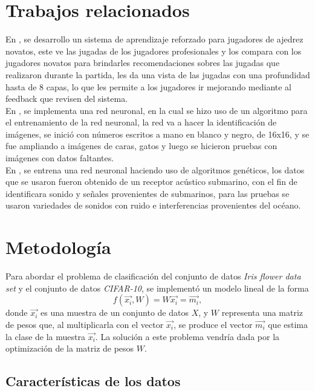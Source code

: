 \documentclass[conference]{IEEEtran}
\begin{document}
\section{Trabajos relacionados}
	En \cite{AppGen}, se desarrollo un sistema de aprendizaje reforzado para jugadores de ajedrez novatos, este ve las jugadas de los jugadores profesionales y los compara con los jugadores novatos para brindarles recomendaciones sobres las jugadas que realizaron durante la partida, les da una vista de las jugadas con una profundidad hasta de 8 capas, lo que les permite a los jugadores ir mejorando mediante al feedback que revisen del sistema. \\
    
    En \cite{Lamos-Sweeney}, se implementa una red neuronal, en la cual se hizo uso de un algoritmo para el entrenamiento de la red neuronal, la red va a hacer la identificación de imágenes, se inició con números escritos a mano en blanco y negro, de 16x16, y se fue ampliando a imágenes de caras, gatos y luego se hicieron pruebas con imágenes con datos faltantes. \\ 
    
    En \cite{Montana}, se entrena una red neuronal haciendo uso de algoritmos genéticos, los datos que se usaron fueron obtenido de un receptor acústico submarino, con el fin de identificara sonido y señales provenientes de submarinos, para las pruebas se usaron variedades de sonidos con ruido e interferencias provenientes del océano. 

\section{Metodología}
	
    Para abordar el problema de clasificación del conjunto de datos \textit{Iris flower data set} y el conjunto de datos \textit{CIFAR-10}, se implementó un modelo lineal de la forma 
 \begin{equation}
 	f(\vec{x_i},W) = W\vec{x_i} = \vec{m_i},
 \end{equation}
 donde $\vec{x_i}$ es una muestra de un conjunto de datos $X$, y $W$ representa una matriz de pesos que, al multiplicarla con el vector $\vec{x_i}$, se produce el vector $\vec{m_i}$ que  estima la clase de la muestra $\vec{x_i}$. 
La solución a este problema vendría dada por la optimización de la matriz de pesos $W$. 

\subsection{Características de los datos}
\end{document}

